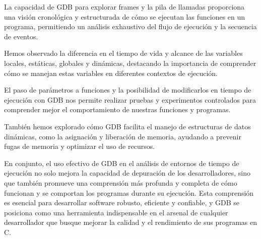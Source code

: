 \documentclass[12pt,a4paper]{article}
\begin{document}
La capacidad de GDB para explorar frames y la pila de llamadas proporciona una visión cronológica y estructurada de cómo se ejecutan las funciones en un programa, permitiendo un análisis exhaustivo del flujo de ejecución y la secuencia de eventos.

Hemos observado la diferencia en el tiempo de vida y alcance de las variables locales, estáticas, globales y dinámicas, destacando la importancia de comprender cómo se manejan estas variables en diferentes contextos de ejecución.

El paso de parámetros a funciones y la posibilidad de modificarlos en tiempo de ejecución con GDB nos permite realizar pruebas y experimentos controlados para comprender mejor el comportamiento de nuestras funciones y programas.

También hemos explorado cómo GDB facilita el manejo de estructuras de datos dinámicas, como la asignación y liberación de memoria, ayudando a prevenir fugas de memoria y optimizar el uso de recursos.

En conjunto, el uso efectivo de GDB en el análisis de entornos de tiempo de ejecución no solo mejora la capacidad de depuración de los desarrolladores, sino que también promueve una comprensión más profunda y completa de cómo funcionan y se comportan los programas durante su ejecución. Esta comprensión es esencial para desarrollar software robusto, eficiente y confiable, y GDB se posiciona como una herramienta indispensable en el arsenal de cualquier desarrollador que busque mejorar la calidad y el rendimiento de sus programas en C.
\end{document}
